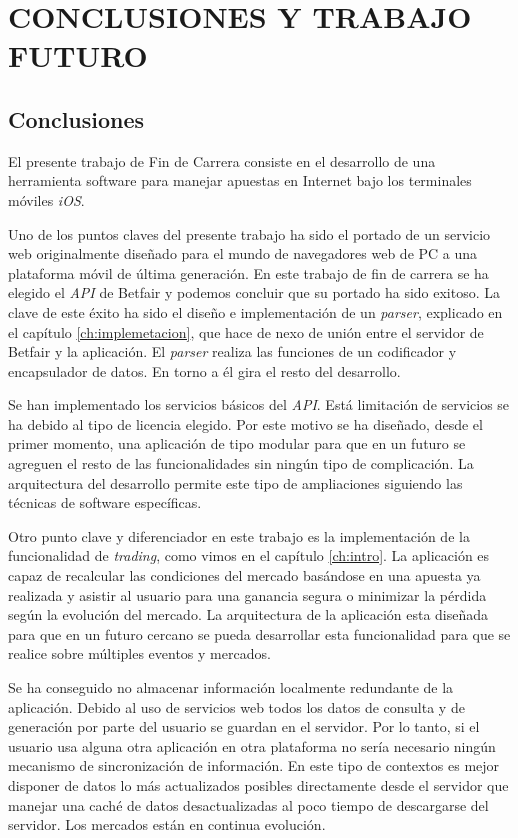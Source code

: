 \chapter{CONCLUSIONES Y TRABAJO FUTURO}
\label{ch:conclusiones}

\section{Conclusiones}
 El presente trabajo de Fin de Carrera consiste en el desarrollo de una herramienta software para manejar apuestas en Internet bajo los terminales móviles \emph{iOS}. 
 
Uno de los puntos claves del presente trabajo ha sido el portado de un servicio web originalmente diseñado para el mundo de navegadores web de PC a una plataforma móvil de última generación. En este trabajo de fin de carrera se ha elegido el \emph{API} de Betfair y podemos concluir que su portado ha sido exitoso. La clave de este éxito ha sido el diseño e implementación de un \emph{parser}, explicado en el capítulo \ref{ch:implemetacion}, que hace de nexo de unión entre el servidor de Betfair y la aplicación. El \emph{parser} realiza las funciones de un codificador y encapsulador de datos. En torno a él gira el resto del desarrollo.
 
 Se han implementado los servicios básicos del \emph{API}. Está limitación de servicios se ha debido al tipo de licencia elegido. Por este motivo se ha diseñado, desde el primer momento, una aplicación de tipo modular para que en un futuro se agreguen el resto de las funcionalidades sin ningún tipo de complicación. La arquitectura del desarrollo permite este tipo de ampliaciones siguiendo las técnicas de software específicas.
 
 Otro punto clave y diferenciador en este trabajo es la implementación de la funcionalidad de \emph{trading}, como vimos en el capítulo \ref{ch:intro}. La aplicación es capaz de recalcular las condiciones del mercado basándose en una apuesta ya realizada y asistir al usuario para una ganancia segura o minimizar la pérdida según la evolución del mercado. La arquitectura de la aplicación esta diseñada para que en un futuro cercano se pueda desarrollar esta funcionalidad para que se realice sobre múltiples eventos y mercados.
 
 Se ha conseguido no almacenar información localmente redundante de la aplicación. Debido al uso de servicios web todos los datos de consulta y de generación por parte del usuario se guardan en el servidor. Por lo tanto, si el usuario usa alguna otra aplicación en otra plataforma no sería necesario ningún mecanismo de sincronización de información. En este tipo de contextos es mejor disponer de datos lo más actualizados posibles directamente desde el servidor que manejar una caché de datos desactualizadas al poco tiempo de descargarse del servidor. Los mercados están en continua evolución.
 
